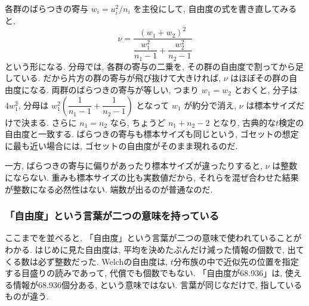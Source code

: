     各群のばらつきの寄与 $w_i = u_i^2/n_i$ を主役にして, 自由度の式を書き直してみると,
    \[
      \nu = \frac{(w_1 + w_2)^2}{\dfrac{w_1^2}{n_1 - 1} + \dfrac{w_2^2}{n_2 - 1}}
    \]
    という形になる.
    分母では, 各群の寄与の二乗を, その群の自由度で割ってから足している.
    だから片方の群の寄与が飛び抜けて大きければ, $\nu$ はほぼその群の自由度になる.
    両群のばらつきの寄与が等しい, つまり $w_1 = w_2$ とおくと, 分子は $4w_1^2$, 分母は $w_1^2\left(\dfrac{1}{n_1-1} + \dfrac{1}{n_2-1}\right)$ となって $w_1$ が約分で消え, $\nu$ は標本サイズだけで決まる.
    さらに $n_1 = n_2$ なら, ちょうど $n_1 + n_2 - 2$ となり, 古典的な$t$検定の自由度と一致する.
    ばらつきの寄与も標本サイズも同じという, ゴセットの想定に最も近い場合には, ゴセットの自由度がそのまま現れるのだ.

    一方, ばらつきの寄与に偏りがあったり標本サイズが違ったりすると, $\nu$ は整数にならない.
    重みも標本サイズの比も実数値だから, それらを混ぜ合わせた結果が整数になる必然性はない.
    端数が出るのが普通なのだ.

    \subsubsection*{「自由度」という言葉が二つの意味を持っている}

    ここまでを並べると, 「自由度」という言葉が二つの意味で使われていることがわかる.
    はじめに見た自由度は, 平均を決めたぶんだけ減った情報の個数で, 出てくる数は必ず整数だった.
    Welchの自由度は, $t$分布族の中で近似先の位置を指定する目盛りの読みであって, 代償でも個数でもない.
    「自由度が68.936」は, 使える情報が68.936個分ある, という意味ではない. 言葉が同じなだけで, 指しているものが違う.
